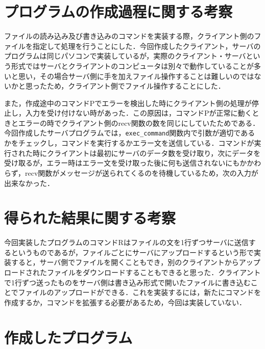 \documentclass{jarticle}[11pt]
\begin{document}
    \section{プログラムの作成過程に関する考察}
    ファイルの読み込み及び書き込みのコマンドを実装する際，クライアント側のファイルを指定して処理を行うことにした．今回作成したクライアント，サーバのプログラムは同じパソコンで実装しているが，実際のクライアント・サーバという形式ではサーバとクライアントのコンピュータは別々で動作していることが多いと思い，その場合サーバ側に手を加えファイル操作することは難しいのではないかと思ったため，クライアント側でファイル操作することにした．

また，作成途中のコマンドPでエラーを検出した時にクライアント側の処理が停止し，入力を受け付けない時があった．この原因は，コマンドPが正常に動くときとエラーの時でクライアント側のrecv関数の数を同じにしていたためである．今回作成したサーバプログラムでは，\verb|exec_command|関数内で引数が適切であるかをチェックし，コマンドを実行するかエラー文を送信している．コマンドが実行された時にクライアントは最初にサーバのデータ数を受け取り，次にデータを受け取るが，エラー時はエラー文を受け取った後に何も送信されないにもかかわらず，recv関数がメッセージが送られてくるのを待機しているため，次の入力が出来なかった．

 \section{得られた結果に関する考察}
今回実装したプログラムのコマンドRはファイルの文を1行ずつサーバに送信するというものであるが，ファイルごとにサーバにアップロードするという形で実装すると，サーバ側でファイルを開くこともでき，別のクライアントからアップロードされたファイルをダウンロードすることもできると思った．クライアントで1行ずつ送ったものをサーバ側は書き込み形式で開いたファイルに書き込むことでファイルのアップロードができる．これを実装するには，新たにコマンドを作成するか，コマンドを拡張する必要があるため，今回は実装していない．


    \section{作成したプログラム}
\end{document}
